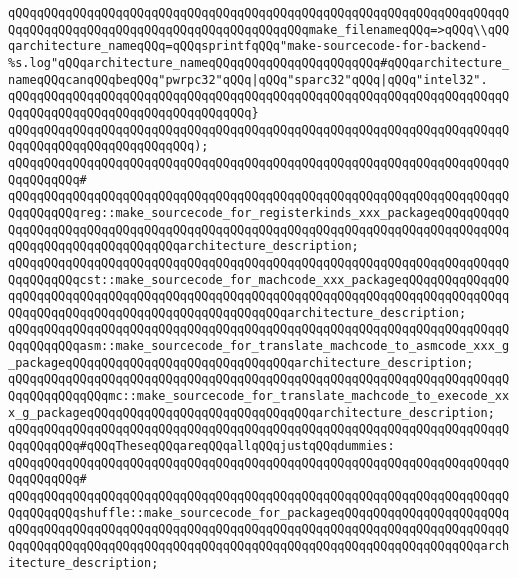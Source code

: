 \verb|qQQqqQQqqQQqqQQqqQQqqQQqqQQqqQQqqQQqqQQqqQQqqQQqqQQqqQQqqQQqqQQqqQQqqQQqqQQqqQQqqQQqqQQqqQQqqQQqqQQqqQQqqQQqqQQqmake_filenameqQQq=>qQQq\\qQQqarchitecture_nameqQQq=qQQqsprintfqQQq"make-sourcecode-for-backend-%s.log"qQQqarchitecture_nameqQQqqQQqqQQqqQQqqQQqqQQq#qQQqarchitecture_nameqQQqcanqQQqbeqQQq"pwrpc32"qQQq|\verb#|qQQq"sparc32"qQQq|qQQq"intel32".#\newline
\verb|qQQqqQQqqQQqqQQqqQQqqQQqqQQqqQQqqQQqqQQqqQQqqQQqqQQqqQQqqQQqqQQqqQQqqQQqqQQqqQQqqQQqqQQqqQQqqQQqqQQqqQQq}|\newline
\verb|qQQqqQQqqQQqqQQqqQQqqQQqqQQqqQQqqQQqqQQqqQQqqQQqqQQqqQQqqQQqqQQqqQQqqQQqqQQqqQQqqQQqqQQqqQQqqQQq);|\newline
\verb|qQQqqQQqqQQqqQQqqQQqqQQqqQQqqQQqqQQqqQQqqQQqqQQqqQQqqQQqqQQqqQQqqQQqqQQqqQQqqQQq#|\newline
\verb|qQQqqQQqqQQqqQQqqQQqqQQqqQQqqQQqqQQqqQQqqQQqqQQqqQQqqQQqqQQqqQQqqQQqqQQqqQQqqQQqreg::make_sourcecode_for_registerkinds_xxx_packageqQQqqQQqqQQqqQQqqQQqqQQqqQQqqQQqqQQqqQQqqQQqqQQqqQQqqQQqqQQqqQQqqQQqqQQqqQQqqQQqqQQqqQQqqQQqqQQqqQQqqQQqarchitecture_description;|\newline
\verb|qQQqqQQqqQQqqQQqqQQqqQQqqQQqqQQqqQQqqQQqqQQqqQQqqQQqqQQqqQQqqQQqqQQqqQQqqQQqqQQqcst::make_sourcecode_for_machcode_xxx_packageqQQqqQQqqQQqqQQqqQQqqQQqqQQqqQQqqQQqqQQqqQQqqQQqqQQqqQQqqQQqqQQqqQQqqQQqqQQqqQQqqQQqqQQqqQQqqQQqqQQqqQQqqQQqqQQqqQQqqQQqqQQqarchitecture_description;|\newline
\verb|qQQqqQQqqQQqqQQqqQQqqQQqqQQqqQQqqQQqqQQqqQQqqQQqqQQqqQQqqQQqqQQqqQQqqQQqqQQqqQQqasm::make_sourcecode_for_translate_machcode_to_asmcode_xxx_g_packageqQQqqQQqqQQqqQQqqQQqqQQqqQQqqQQqarchitecture_description;|\newline
\verb|qQQqqQQqqQQqqQQqqQQqqQQqqQQqqQQqqQQqqQQqqQQqqQQqqQQqqQQqqQQqqQQqqQQqqQQqqQQqqQQqqQQqmc::make_sourcecode_for_translate_machcode_to_execode_xxx_g_packageqQQqqQQqqQQqqQQqqQQqqQQqqQQqqQQqarchitecture_description;|\newline
\newline
\verb|qQQqqQQqqQQqqQQqqQQqqQQqqQQqqQQqqQQqqQQqqQQqqQQqqQQqqQQqqQQqqQQqqQQqqQQqqQQqqQQq#qQQqTheseqQQqareqQQqallqQQqjustqQQqdummies:|\newline
\verb|qQQqqQQqqQQqqQQqqQQqqQQqqQQqqQQqqQQqqQQqqQQqqQQqqQQqqQQqqQQqqQQqqQQqqQQqqQQqqQQq#|\newline
\verb|qQQqqQQqqQQqqQQqqQQqqQQqqQQqqQQqqQQqqQQqqQQqqQQqqQQqqQQqqQQqqQQqqQQqqQQqqQQqqQQqshuffle::make_sourcecode_for_packageqQQqqQQqqQQqqQQqqQQqqQQqqQQqqQQqqQQqqQQqqQQqqQQqqQQqqQQqqQQqqQQqqQQqqQQqqQQqqQQqqQQqqQQqqQQqqQQqqQQqqQQqqQQqqQQqqQQqqQQqqQQqqQQqqQQqqQQqqQQqqQQqqQQqqQQqqQQqqQQqarchitecture_description;|\newline
